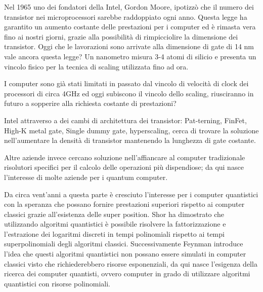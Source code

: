 \cite{S24}Nel 1965 uno dei fondatori della Intel, Gordon Moore, ipotizzò che il numero dei transistor nei microprocessori sarebbe raddoppiato ogni anno. Questa legge ha garantito un aumento costante delle prestazioni per i computer ed è rimasta vera fino ai nostri giorni, grazie alla possibilità di rimpicciolire la dimensione dei transistor. Oggi che le lavorazioni sono arrivate alla dimensione di gate di 14 nm vale ancora questa legge? Un nanometro misura 3-4 atomi di silicio e presenta un vincolo fisico per la tecnica di scaling utilizzata fino ad ora.

I computer sono già stati limitati in passato dal vincolo di velocità di clock dei processori di circa 4GHz ed oggi subiscono il vincolo dello scaling, riusciranno in futuro a sopperire alla richiesta costante di prestazioni?

Intel attraverso a dei cambi di architettura dei transistor: Pat-terning, FinFet, High-K metal gate, Single dummy gate, hyperscaling, cerca di trovare la soluzione nell'aumentare la densità di transistor mantenendo la lunghezza di gate costante.

Altre aziende invece cercano soluzione nell'affiancare al computer tradizionale risolutori specifici per il calcolo delle operazioni più dispendiose; da qui nasce l'interesse di molte aziende per i quantum computer.

\cite{NAC}Da circa vent'anni a questa parte è cresciuto l'interesse per i computer quantistici con la speranza che possano fornire prestazioni superiori rispetto ai computer classici grazie all'esistenza delle super position. Shor ha dimostrato che utilizzando algoritmi quantistici è possibile risolvere la fattorizzazione e l'estrazione dei logaritmi discreti in tempi polinomiali rispetto ai tempi superpolinomiali degli algoritmi classici. Successivamente Feynman introduce l'idea che questi algoritmi quantistici non possano essere simulati in computer classici visto che richiederebbero risorse esponenziali, da qui nasce l'esigenza della ricerca dei computer quantisti, ovvero computer in grado di utilizzare algoritmi quantistici con risorse polinomiali.
